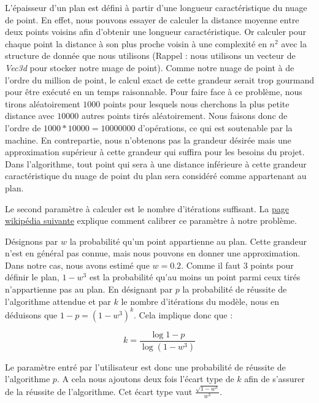 \documentclass[titlepage,11pt,a4paper]{article}
\begin{document}
\par L'épaisseur d'un plan est défini à partir d'une longueur caractéristique du nuage de point. En effet, nous pouvons essayer de calculer la distance moyenne entre deux points voisins afin d'obtenir une longueur caractéristique. Or calculer pour chaque point la distance à son plus proche voisin à une complexité en $n^2$ avec la structure de donnée que nous utilisons (Rappel : nous utilisons un vecteur de \emph{Vec3d} pour stocker notre nuage de point). Comme notre nuage de point à de l'ordre du million de point, le calcul exact de cette grandeur serait trop gourmand pour être exécuté en un temps raisonnable. Pour faire face à ce problème, nous tirons aléatoirement $1000$ points pour lesquels nous cherchons la plus petite distance avec $10000$ autres points tirés aléatoirement. Nous faisons donc de l'ordre de $1000 * 10 000 = 10 000 000$ d'opérations, ce qui est soutenable par la machine. En contrepartie, nous n'obtenons pas la grandeur désirée mais une approximation supérieur à cette grandeur qui suffira pour les besoins du projet. Dans l'algorithme, tout point qui sera à une distance inférieure à cette grandeur caractéristique du nuage de point du plan sera considéré comme appartenant au plan.

\par Le second paramètre à calculer est le nombre d'itérations suffisant. La \href{https://en.wikipedia.org/wiki/Random_sample_consensus}{page wikipédia suivante} explique comment calibrer ce paramètre à notre problème.

\par Désignons par $w$ la probabilité qu'un point appartienne au plan. Cette grandeur n'est en général pas connue, mais nous pouvons en donner une approximation. Dans notre cas, nous avons estimé que $w = 0.2$. Comme il faut $3$ points pour définir le plan, $1-w^3$ est la probabilité qu'au moins un point parmi ceux tirés n'appartienne pas au plan. En désignant par $p$ la probabilité de réussite de l'algorithme attendue et par $k$ le nombre d'itérations du modèle, nous en déduisons que $1-p = (1-w^3)^k$. Cela implique donc que :

$$k = \frac{\log{1-p}}{\log{(1-w^3)}}$$

\par Le paramètre entré par l'utilisateur est donc une probabilité de réussite de l'algorithme $p$. A cela nous ajoutons deux fois l'écart type de $k$ afin de s'assurer de la réussite de l'algorithme. Cet écart type vaut $\frac{\sqrt{1-w^3}}{w^3}$.
\end{document}
